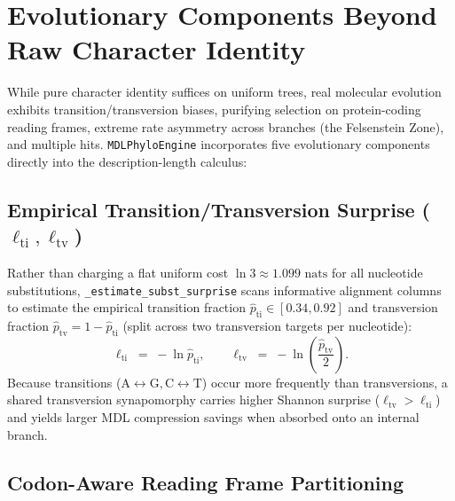 \documentclass[11pt,a4paper]{article}
\begin{document}
\section{Evolutionary Components Beyond Raw Character Identity}

While pure character identity suffices on uniform trees, real molecular evolution exhibits transition/transversion biases, purifying selection on protein-coding reading frames, extreme rate asymmetry across branches (the Felsenstein Zone), and multiple hits. \texttt{MDLPhyloEngine} incorporates five evolutionary components directly into the description-length calculus:

\subsection{Empirical Transition/Transversion Surprise ($\ell_{\text{ti}}, \ell_{\text{tv}}$)}

Rather than charging a flat uniform cost $\ln 3 \approx 1.099\text{ nats}$ for all nucleotide substitutions, \texttt{\_estimate\_subst\_surprise} scans informative alignment columns to estimate the empirical transition fraction $\hat{p}_{\text{ti}} \in [0.34, 0.92]$ and transversion fraction $\hat{p}_{\text{tv}} = 1 - \hat{p}_{\text{ti}}$ (split across two transversion targets per nucleotide):
\begin{equation}
    \ell_{\text{ti}} \;=\; -\ln \hat{p}_{\text{ti}}, \qquad \ell_{\text{tv}} \;=\; -\ln\!\left(\frac{\hat{p}_{\text{tv}}}{2}\right).
\end{equation}
Because transitions ($\text{A}\leftrightarrow\text{G}, \text{C}\leftrightarrow\text{T}$) occur more frequently than transversions, a shared transversion synapomorphy carries higher Shannon surprise ($\ell_{\text{tv}} > \ell_{\text{ti}}$) and yields larger MDL compression savings when absorbed onto an internal branch.

\subsection{Codon-Aware Reading Frame Partitioning}
\end{document}
